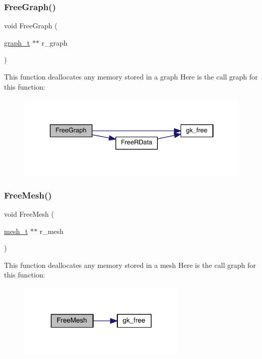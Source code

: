\subsubsection{\texorpdfstring{Free\+Graph()}{FreeGraph()}}
{\footnotesize\ttfamily void Free\+Graph (\begin{DoxyParamCaption}\item[{\hyperlink{a00734}{graph\+\_\+t} $\ast$$\ast$}]{r\+\_\+graph }\end{DoxyParamCaption})}

This function deallocates any memory stored in a graph Here is the call graph for this function\+:\nopagebreak
\begin{figure}[H]
\begin{center}
\leavevmode
\includegraphics[width=334pt]{a00945_a0b364b3d4f25b8dae8722764639a0e8b_cgraph}
\end{center}
\end{figure}
\mbox{\label{a00945_a64fe6e28f1752eb81b0314826921277d}} 
\subsubsection{\texorpdfstring{Free\+Mesh()}{FreeMesh()}}
{\footnotesize\ttfamily void Free\+Mesh (\begin{DoxyParamCaption}\item[{\hyperlink{a00738}{mesh\+\_\+t} $\ast$$\ast$}]{r\+\_\+mesh }\end{DoxyParamCaption})}

This function deallocates any memory stored in a mesh Here is the call graph for this function\+:\nopagebreak
\begin{figure}[H]
\begin{center}
\leavevmode
\includegraphics[width=228pt]{a00945_a64fe6e28f1752eb81b0314826921277d_cgraph}
\end{center}
\end{figure}
\mbox{\label{a00945_a12a6bda050dc470113f4d1cd5aa5777d}} 

